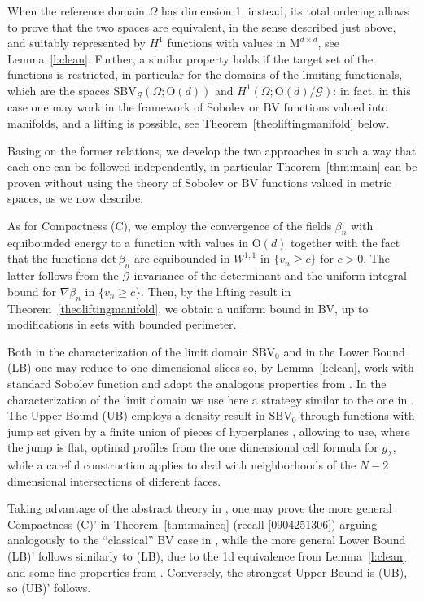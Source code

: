 \documentclass[a4paper,reqno]{amsart}
\newcommand{\BV}{\mathrm{BV}}
\newcommand{\SBVG}{\mathrm{SBV}_{\mathcal{G}}}
\theoremstyle{remark}
\newcommand{\G}{\mathcal{G}}
\newcommand{\On}{\mathrm{O}(d)}
\newcommand{\Mno}{\mathrm{M}^{d\times d}}
\newcommand{\PC}{\mathrm{SBV}_0}
\numberwithin{equation}{section}
\begin{document}
When the reference domain $\Omega$ has dimension 1, instead, its total ordering 
allows to prove that the two spaces are equivalent, in the sense described just above, and suitably represented 
by $H^1$ functions with values in $\Mno$, see Lemma~\ref{l:clean}.
Further, a similar property holds if the target set of the functions is restricted, in particular for the domains of the limiting functionals, which are
the spaces $\SBVG(\Omega; \On)$ and  $H^1(\Omega; \On/\G)$: in fact, in this case one may work in the framework of Sobolev or $\BV$ functions valued into manifolds, and 
a lifting is possible, see Theorem~\ref{theoliftingmanifold} below.

Basing on the former relations,
we develop the two approaches in such a way that each one can be followed independently, in particular Theorem~\ref{thm:main} can be proven without using the theory 
 of Sobolev or $\BV$ functions valued in metric spaces, as we now describe.
 
As for Compactness (C), we employ the convergence of the fields $\beta_n$ with equibounded energy to a function with values in $\On$ together with the fact that the functions $\mathrm{det}\,\beta_n$ are equibounded
 in $W^{1,1}$  in $\{v_n\geq c\}$ for $c>0$. The latter 
follows from the $\G$-invariance of the determinant
 and the uniform integral bound for $\nabla \beta_n$ in $\{v_n\geq c\}$.
Then, by the lifting result in Theorem~\ref{theoliftingmanifold}, we obtain a uniform bound in
 $\BV$, up to modifications in
 sets with bounded perimeter. 
 
 Both in the characterization of the limit domain $\PC$ and in the Lower Bound (LB) one may 
 reduce to one dimensional slices so,  by Lemma~\ref{l:clean},
 work with standard Sobolev function and adapt the analogous properties
from \cite{CFI14}. In the characterization of the limit domain we use here a strategy similar to the one in \cite{ConFocIur25}.
The Upper Bound (UB) employs a density result in $\PC$ through functions with jump set given by a finite union of pieces of hyperplanes \cite{BCG14}, allowing to use, where the jump is flat, optimal profiles from the one dimensional cell formula for $g_\lambda$, while a careful construction applies to deal with
neighborhoods of the $N-2$ dimensional intersections of different faces. 
 
Taking advantage of the abstract theory in \cite{Amb90SBVX}, one may prove the more general Compactness (C)' in Theorem~\ref{thm:maineq} (recall \eqref{0904251306}) arguing analogously to the ``classical'' $\BV$ case in \cite{CFI14}, while the more general Lower Bound (LB)' follows similarly to (LB), due to the 1d equivalence from Lemma~\ref{l:clean} and some fine properties from \cite{Amb90SBVX}. Conversely, the strongest Upper Bound is (UB), so (UB)' follows.  
\end{document}
